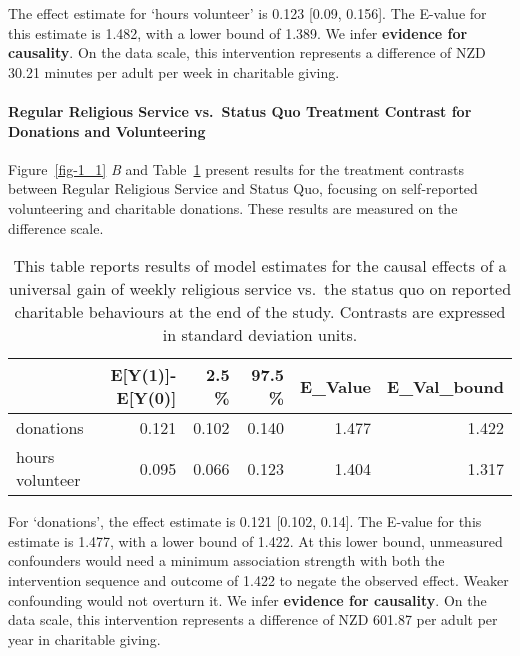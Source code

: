 \documentclass[
  single column]{article}
\let\oldparagraph\paragraph
\renewcommand{\paragraph}[1]{\oldparagraph{#1}\mbox{}}
\begin{document}
The effect estimate for `hours volunteer' is 0.123 {[}0.09, 0.156{]}.
The E-value for this estimate is 1.482, with a lower bound of 1.389. We
infer \textbf{evidence for causality}. On the data scale, this
intervention represents a difference of NZD 30.21 minutes per adult per
week in charitable giving.

\paragraph{Regular Religious Service vs.~Status Quo Treatment Contrast
for Donations and
Volunteering}\label{regular-religious-service-vs.-status-quo-treatment-contrast-for-donations-and-volunteering}

Figure~\ref{fig-1_1} \emph{B} and Table~\ref{tbl-1_2} present results
for the treatment contrasts between Regular Religious Service and Status
Quo, focusing on self-reported volunteering and charitable donations.
These results are measured on the difference scale.

\begin{longtable}[]{@{}lrrrrr@{}}

\caption{\label{tbl-1_2}This table reports results of model estimates
for the causal effects of a universal gain of weekly religious service
vs.~the status quo on reported charitable behaviours at the end of the
study. Contrasts are expressed in standard deviation units.}

\tabularnewline

\toprule\noalign{}
& E{[}Y(1){]}-E{[}Y(0){]} & 2.5 \% & 97.5 \% & E\_Value &
E\_Val\_bound \\
\midrule\noalign{}
\endhead
\bottomrule\noalign{}
\endlastfoot
donations & 0.121 & 0.102 & 0.140 & 1.477 & 1.422 \\
hours volunteer & 0.095 & 0.066 & 0.123 & 1.404 & 1.317 \\

\end{longtable}

For `donations', the effect estimate is 0.121 {[}0.102, 0.14{]}. The
E-value for this estimate is 1.477, with a lower bound of 1.422. At this
lower bound, unmeasured confounders would need a minimum association
strength with both the intervention sequence and outcome of 1.422 to
negate the observed effect. Weaker confounding would not overturn it. We
infer \textbf{evidence for causality}. On the data scale, this
intervention represents a difference of NZD 601.87 per adult per year in
charitable giving.
\end{document}
